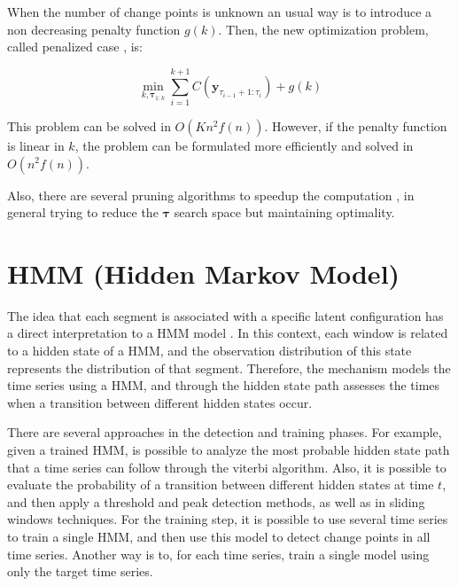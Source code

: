 When the number of change points is unknown an usual way is to introduce a non decreasing penalty function $g(k)$. Then, the new optimization problem, called penalized case \cite{on_optimal_multiple_changepoint_algorithms_for_large_data}, is:

\begin{equation}
    \min_{k, \boldsymbol \tau_{1 : k}} \sum \limits_{i = 1}^{k + 1} C(\mathbf{y}_{\tau_{i - 1} + 1 : \tau_{i}}) + g(k)
\end{equation}

This problem can be solved in $O(K n^{2} f(n))$. However, if the penalty function is linear in $k$, the problem can be formulated more efficiently and solved in $O(n^{2} f(n))$.

Also, there are several pruning algorithms to speedup the computation \cite{optimal_detection_of_changepoints_with_a_linear_computational_cost, on_optimal_multiple_changepoint_algorithms_for_large_data, computationally_efficient_changepoint_detection_for_a_range_of_penalties}, in general trying to reduce the $\boldsymbol \tau$ search space but maintaining optimality.

\section{HMM (Hidden Markov Model)}

The idea that each segment is associated with a specific latent configuration has a direct interpretation to a HMM model \cite{a_hidden_markov_model_segmentation_procedure_for_hydrological_and_environmental_time_series, fast_estimation_of_posterior_probabilities_in_change-point_analysis_through_a_constrained_hidden_markov_model, inertial_hidden_markov_models_modeling_change_in_multivariate_time_series}. In this context, each window is related to a hidden state of a HMM, and the observation distribution of this state represents the distribution of that segment. Therefore, the mechanism models the time series using a HMM, and through the hidden state path assesses the times when a transition between different hidden states occur.

There are several approaches in the detection and training phases. For example, given a trained HMM, is possible to analyze the most probable hidden state path that a time series can follow through the viterbi algorithm. Also, it is possible to evaluate the probability of a transition between different hidden states at time $t$, and then apply a threshold and peak detection methods, as well as in sliding windows techniques. For the training step, it is possible to use several time series to train a single HMM, and then use this model to detect change points in all time series. Another way is to, for each time series, train a single model using only the target time series.

